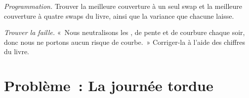 \begin{exercise}[$\star\star\star$]\label{exo:rc:rates-risk:7}
\emph{Programmation.} Trouver la meilleure couverture à un seul swap et la meilleure
couverture à quatre swaps du livre, ainsi que la variance que chacune laisse.
\end{exercise}

\begin{exercise}[$\star\star\star$]\label{exo:rc:rates-risk:8}
\emph{Trouver la faille.} «~Nous neutralisons les , de pente et de courbure
chaque soir, donc nous ne portons aucun risque de courbe.~» Corriger-la à l'aide des chiffres du livre.
\end{exercise}

\section{Problème~: La journée tordue}


